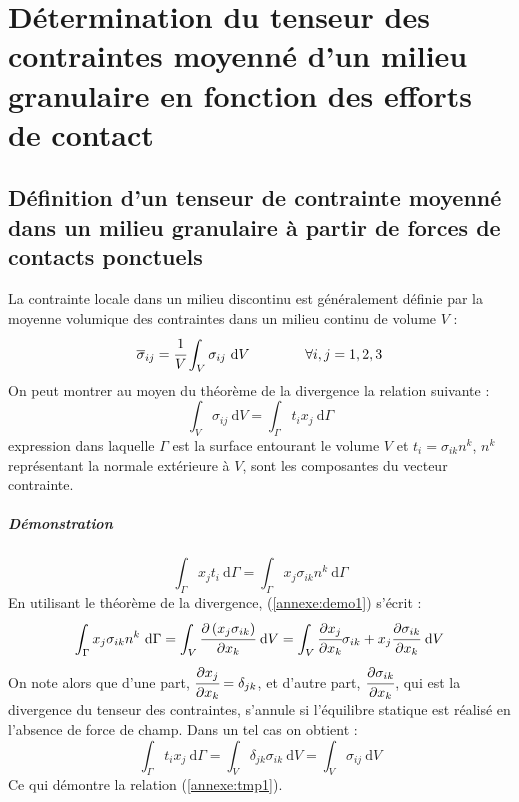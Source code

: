 \chapter[Contraintes mésoscopiques du milieu granulaire]{Détermination du tenseur des contraintes moyenné d'un milieu granulaire en fonction des efforts de contact}
\label{annexe:contraintes}

\section*{Définition d'un tenseur de contrainte moyenné dans un milieu granulaire à partir de forces de contacts ponctuels}
La contrainte locale dans un milieu discontinu est généralement définie par la moyenne volumique des contraintes dans un milieu continu de volume $V$ :
\begin{equation}\label{annexe:def_contrainte_moyenne}
	\overline{\sigma}_{ij}
	= \cfrac{1}{V} \int_V \sigma_{ij}\ \mathrm{d}V
	\qquad\qquad
	\forall i,j = 1,2,3
\end{equation}
On peut montrer au moyen du théorème de la divergence la relation suivante :
\begin{equation}\label{annexe:tmp1}
	\int_V \sigma_{ij}\ \mathrm{d}V
	= \int_\Gamma t_ix_j\ \mathrm{d}\Gamma
\end{equation}
expression dans laquelle $\Gamma$ est la surface entourant le volume $V$ et $t_i = \sigma_{ik}n^k$, $n^k$ représentant la normale extérieure à $V$, sont les composantes du vecteur contrainte.
	\paragraph{Démonstration}
	\begin{equation}\label{annexe:demo1}
		\int_\Gamma x_j t_i\ \mathrm{d}\Gamma
		= \int_\Gamma x_j \sigma_{ik} n^k\ \mathrm{d}\Gamma
	\end{equation}
	En utilisant le théorème de la divergence, (\ref{annexe:demo1}) s'écrit :
	\begin{equation}\label{annexe:demo2}
		\int_\Gamma x_j \sigma_{ik} n^k\ \mathrm{d}\Gamma
		= \int_V \partialdiff{\left(x_j \sigma_{ik}\right)}{x_k}\ \mathrm{d}V
		= \int_V \partialdiff{x_j}{x_k}\sigma_{ik} + x_j \partialdiff{\sigma_{ik}}{x_k}\ \mathrm{d}V
	\end{equation}
	On note alors que d'une part, $\cfrac{\partial x_j}{\partial x_k} = \delta_{jk}$, et d'autre part, $\cfrac{\partial \sigma_{ik}}{\partial x_k}$, qui est la divergence du tenseur des contraintes, s'annule si l'équilibre statique est réalisé en l'absence de force de champ. Dans un tel cas on obtient :
	\begin{equation}\label{annexe:demo3}
		\int_\Gamma t_i x_j\ \mathrm{d}\Gamma
		= \int_V \delta_{jk} \sigma_{ik}\ \mathrm{d}V
		= \int_V \sigma_{ij}\ \mathrm{d}V
	\end{equation}
	Ce qui démontre la relation (\ref{annexe:tmp1}).
